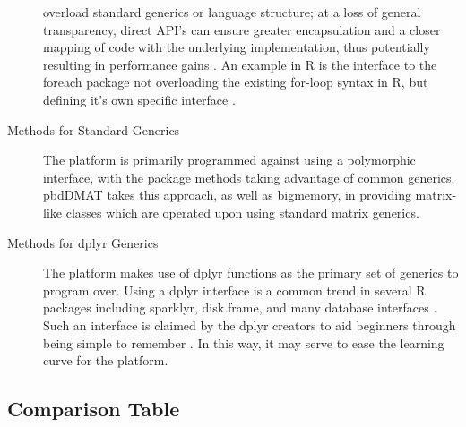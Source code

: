 \documentclass[a4paper,10pt]{article}
\begin{document}
\begin{description}
      overload standard generics or language structure;
      at a loss of general transparency, direct API's can ensure
      greater encapsulation and a closer mapping of code with the
      underlying implementation, thus potentially resulting in
      performance gains \cite{bierhoff2009api}.
      An example in R is the interface to the foreach package not
      overloading the existing for-loop syntax in R, but defining it's
      own specific interface \cite{microsoft20}. 
\item[Methods for Standard Generics]
      The platform is primarily programmed against using a polymorphic
      interface, with the package methods taking advantage of common
      generics.
      pbdDMAT takes this approach, as well as bigmemory, in providing
      matrix-like classes which are operated upon using standard matrix
      generics\cite{pbdDMATpackage}\cite{kane13:bigmemory}.
\item[Methods for dplyr Generics]
      The platform makes use of dplyr functions as the primary set of
      generics to program over.
      Using a dplyr interface is a common trend in several R packages
      including sparklyr, disk.frame, and many database interfaces
      \cite{luraschi20}\cite{zj20}.
      Such an interface is claimed by the dplyr creators to aid
      beginners through being simple to remember \cite{wickham2019welcome}.
      In this way, it may serve to ease the learning curve for the platform.
\end{description}

\subsection{Comparison Table}\label{sec:comp-tab}
\end{document}
